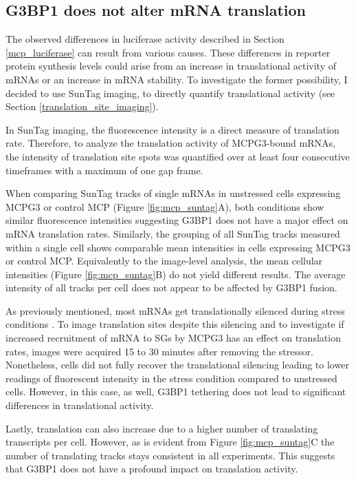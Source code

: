 \subsection{G3BP1 does not alter mRNA translation}\label{mcp_suntag}

The observed differences in luciferase activity described in Section \ref{mcp_luciferase} can result from various causes.
These differences in reporter protein synthesis levels could arise from an increase in translational activity of mRNAs or an increase in mRNA stability.
To investigate the former possibility, I decided to use SunTag imaging, to directly quantify translational activity (see Section \ref{translation_site_imaging}).

In SunTag imaging, the fluorescence intensity is a direct measure of translation rate.
Therefore, to analyze the translation activity of MCPG3-bound mRNAs, the intensity of translation site spots was quantified over at least four consecutive timeframes with a maximum of one gap frame.

When comparing SunTag tracks of single mRNAs in unstressed cells expressing MCPG3 or control MCP (Figure \ref{fig:mcp_suntag}A), both conditions show similar fluorescence intensities suggesting G3BP1 does not have a major effect on mRNA translation rates.
Similarly, the grouping of all SunTag tracks measured within a single cell shows comparable mean intensities in cells expressing MCPG3 or control MCP.
Equivalently to the image-level analysis, the mean cellular intensities (Figure \ref{fig:mcp_suntag}B) do not yield different results.
The average intensity of all tracks per cell does not appear to be affected by G3BP1 fusion.

As previously mentioned, most mRNAs get translationally silenced during stress conditions \cite{wilbertz_single-molecule_2019}.
To image translation sites despite this silencing and to investigate if increased recruitment of mRNA to SGs by MCPG3 has an effect on translation rates, images were acquired 15 to 30 minutes after removing the stressor.
Nonetheless, cells did not fully recover the translational silencing leading to lower readings of fluorescent intensity in the stress condition compared to unstressed cells.
However, in this case, as well, G3BP1 tethering does not lead to significant differences in translational activity.

Lastly, translation can also increase due to a higher number of translating transcripts per cell.
However, as is evident from Figure \ref{fig:mcp_suntag}C the number of translating tracks stays consistent in all experiments.
This suggests that G3BP1 does not have a profound impact on translation activity.

